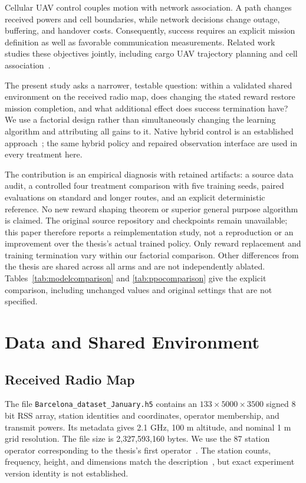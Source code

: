 \documentclass[conference]{IEEEtran}
\begin{document}
Cellular UAV control couples motion with network association. A path changes
received powers and cell boundaries, while network decisions change outage,
buffering, and handover costs. Consequently, success requires an explicit
mission definition as well as favorable communication measurements. Related
work studies these objectives jointly, including cargo UAV trajectory planning
and cell association~\cite{cherif}.

The present study asks a narrower, testable question: within a validated shared
environment on the received radio map, does changing the stated reward restore
mission completion, and what additional effect does success termination have?
We use a factorial design rather than simultaneously changing the learning
algorithm and attributing all gains to it. Native hybrid control is an
established approach~\cite{hybrid}; the same hybrid policy and repaired
observation interface are used in every treatment here.

The contribution is an empirical diagnosis with retained artifacts: a source
data audit, a controlled four treatment comparison with five training seeds,
paired evaluations on standard and longer routes, and an explicit deterministic
reference. No new reward shaping theorem or superior general purpose algorithm
is claimed. The original source repository and checkpoints remain unavailable;
this paper therefore reports a reimplementation study, not a reproduction or
an improvement over the thesis's actual trained policy.
Only reward replacement and training termination vary within our factorial
comparison. Other differences from the thesis are shared across all arms and
are not independently ablated. Tables~\ref{tab:modelcomparison} and
\ref{tab:ppocomparison} give the explicit comparison, including unchanged
values and original settings that are not specified.

\section{Data and Shared Environment}
\subsection{Received Radio Map}
The file \texttt{Barcelona\_dataset\_January.h5} contains an
\(133\times5000\times3500\) signed 8 bit RSS array, station identities and
coordinates, operator membership, and transmit powers. Its metadata gives
2.1 GHz, 100 m altitude, and nominal 1 m grid resolution. The file size is
2,327,593,160 bytes. We use the 87 station operator corresponding to the thesis's
first operator~\cite[p.~14, Sec.~6.1]{thesis}. The station counts, frequency,
height, and dimensions match the description~\cite[p.~6, Sec.~3.1.1;
p.~7, Table~2]{thesis}, but exact experiment version identity is not established.
\end{document}
